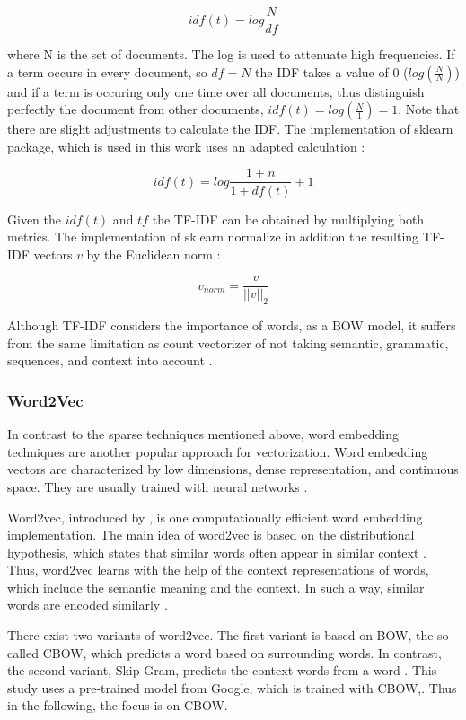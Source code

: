 \documentclass[12pt, a4paper, titlepage]{article}
\begin{document}
\[idf(t) = log \frac{N}{df} \]

where N is the set of documents. The log is used to attenuate high frequencies. If a term occurs in every document, so $df = N$ the \ac{IDF} takes a value of 0 ($log (\frac{N}{N})$) and if a term is occuring only one time over all documents, thus distinguish perfectly the document from other documents, $idf(t) = log (\frac{N}{1}) = 1$. \citep{sidorov2019} Note that there are slight adjustments to calculate the \ac{IDF}. \citep{robertson2004} The implementation of sklearn package, which is used in this work uses an adapted calculation \citep{scikit-learn}:

\[idf(t) = log \frac{1+n}{1+df(t)} + 1 \] 

Given the $idf(t)$ and $tf$ the \ac{TF-IDF} can be obtained by multiplying both metrics. The implementation of sklearn normalize in addition the resulting \ac{TF-IDF} vectors $v$ by the Euclidean norm \citep{scikit-learn}: 

\[v_{norm} = \frac{v}{||v||_2} \]

Although \ac{TF-IDF} considers the importance of words, as a \ac{BOW} model, it suffers from the same limitation as count vectorizer of not taking semantic, grammatic, sequences, and context into account \citep{sarkar2016}. 

\subsubsection*{Word2Vec}
In contrast to the sparse techniques mentioned above, word embedding techniques are another popular approach for vectorization. Word embedding vectors are characterized by low dimensions, dense representation, and continuous space. They are usually trained with neural networks \citep{li2015, jin2016}. 

Word2vec, introduced by \citet{mikolov2013}, is one computationally efficient word embedding implementation. The main idea of word2vec is based on the distributional hypothesis, which states that similar words often appear in similar context \citep{sahlgren2008}. Thus, word2vec learns with the help of the context representations of words, which include the semantic meaning and the context. In such a way, similar words are encoded similarly \citep{sarkar2016}. 

There exist two variants of word2vec. The first variant is based on \ac{BOW}, the so-called \ac{CBOW}, which predicts a word based on surrounding words. In contrast, the second variant, Skip-Gram, predicts the context words from a word \citep{ajose2020, sarkar2016}. This study uses a pre-trained model from Google, which is trained with \ac{CBOW},. Thus in the following, the focus is on \ac{CBOW}. 
\end{document}
